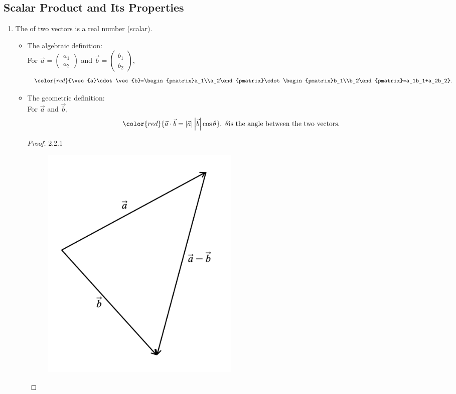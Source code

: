 \documentclass[12pt, a4paper]{article}
\begin{document}
\subsection{Scalar Product and Its Properties}
\begin{enumerate}
  \item The \textbf{\color{red}{scalar product}} of two vectors is a real number (scalar). 
  \begin{itemize}
    \item The algebraic definition: \\
    For $\vec{a}=\begin{pmatrix}a_1\\a_2\end{pmatrix}$ and $\vec{b}=\begin{pmatrix}b_1\\b_2\end{pmatrix}$,
    $${\color{red}{\vec{a}\cdot\vec{b}=\begin{pmatrix}a_1\\a_2\end{pmatrix}\cdot\begin{pmatrix}b_1\\b_2\end{pmatrix}=a_1b_1+a_2b_2}}.$$
    {\color{green}{The scalar product is also called the dot product. }}
    \item The geometric definition: \\
    For $\vec{a}$ and $\vec{b}$,
    $${\color{red}{\vec{a}\cdot\vec{b}=\left|\vec{a}\right|\left|\vec{b}\right|\cos\theta}},\ \theta{\text{is the angle between the two vectors.}}$$
    \begin{proof}{2.2.1}{}
      \begin{figure}[H]
        \centering
        \includegraphics[width=0.5\textwidth]{Fig.7.jpg}

\end{figure}
\end{proof}
\end{itemize}
\end{enumerate}
\end{document}
